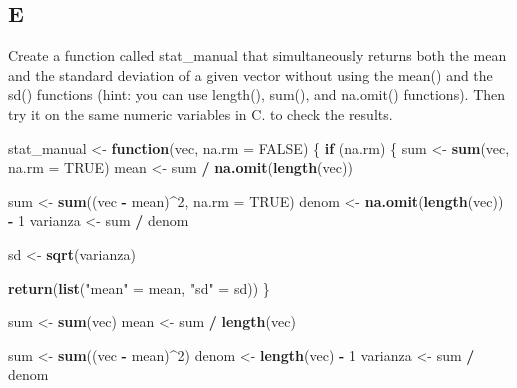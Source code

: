 \documentclass[
]{article}
\newenvironment{Shaded}{\begin{snugshade}}{\end{snugshade}}
\newcommand{\AttributeTok}[1]{\textcolor[rgb]{0.13,0.29,0.53}{#1}}
\newcommand{\ConstantTok}[1]{\textcolor[rgb]{0.56,0.35,0.01}{#1}}
\newcommand{\ControlFlowTok}[1]{\textcolor[rgb]{0.13,0.29,0.53}{\textbf{#1}}}
\newcommand{\DecValTok}[1]{\textcolor[rgb]{0.00,0.00,0.81}{#1}}
\newcommand{\FunctionTok}[1]{\textcolor[rgb]{0.13,0.29,0.53}{\textbf{#1}}}
\newcommand{\NormalTok}[1]{#1}
\newcommand{\OtherTok}[1]{\textcolor[rgb]{0.56,0.35,0.01}{#1}}
\newcommand{\SpecialCharTok}[1]{\textcolor[rgb]{0.81,0.36,0.00}{\textbf{#1}}}
\newcommand{\StringTok}[1]{\textcolor[rgb]{0.31,0.60,0.02}{#1}}
\begin{document}
\hypertarget{e}{%
\subsection{E}\label{e}}

Create a function called stat\_manual that simultaneously returns both
the mean and the standard deviation of a given vector without using the
mean() and the sd() functions (hint: you can use length(), sum(), and
na.omit() functions). Then try it on the same numeric variables in C. to
check the results.

\begin{Shaded}
\begin{Highlighting}[]
\NormalTok{stat\_manual }\OtherTok{\textless{}{-}} \ControlFlowTok{function}\NormalTok{(vec, }\AttributeTok{na.rm =} \ConstantTok{FALSE}\NormalTok{) \{}
  \ControlFlowTok{if}\NormalTok{ (na.rm) \{}
\NormalTok{    sum }\OtherTok{\textless{}{-}} \FunctionTok{sum}\NormalTok{(vec, }\AttributeTok{na.rm =} \ConstantTok{TRUE}\NormalTok{)}
\NormalTok{    mean }\OtherTok{\textless{}{-}}\NormalTok{ sum }\SpecialCharTok{/} \FunctionTok{na.omit}\NormalTok{(}\FunctionTok{length}\NormalTok{(vec))}

\NormalTok{    sum }\OtherTok{\textless{}{-}} \FunctionTok{sum}\NormalTok{((vec }\SpecialCharTok{{-}}\NormalTok{ mean)}\SpecialCharTok{\^{}}\DecValTok{2}\NormalTok{, }\AttributeTok{na.rm =} \ConstantTok{TRUE}\NormalTok{)}
\NormalTok{    denom }\OtherTok{\textless{}{-}} \FunctionTok{na.omit}\NormalTok{(}\FunctionTok{length}\NormalTok{(vec)) }\SpecialCharTok{{-}} \DecValTok{1}
\NormalTok{    varianza }\OtherTok{\textless{}{-}}\NormalTok{ sum }\SpecialCharTok{/}\NormalTok{ denom}

\NormalTok{    sd }\OtherTok{\textless{}{-}} \FunctionTok{sqrt}\NormalTok{(varianza)}

    \FunctionTok{return}\NormalTok{(}\FunctionTok{list}\NormalTok{(}\StringTok{"mean"} \OtherTok{=}\NormalTok{ mean, }\StringTok{"sd"} \OtherTok{=}\NormalTok{ sd))}
\NormalTok{  \}}

\NormalTok{  sum }\OtherTok{\textless{}{-}} \FunctionTok{sum}\NormalTok{(vec)}
\NormalTok{  mean }\OtherTok{\textless{}{-}}\NormalTok{ sum }\SpecialCharTok{/} \FunctionTok{length}\NormalTok{(vec)}

\NormalTok{  sum }\OtherTok{\textless{}{-}} \FunctionTok{sum}\NormalTok{((vec }\SpecialCharTok{{-}}\NormalTok{ mean)}\SpecialCharTok{\^{}}\DecValTok{2}\NormalTok{)}
\NormalTok{  denom }\OtherTok{\textless{}{-}} \FunctionTok{length}\NormalTok{(vec) }\SpecialCharTok{{-}} \DecValTok{1}
\NormalTok{  varianza }\OtherTok{\textless{}{-}}\NormalTok{ sum }\SpecialCharTok{/}\NormalTok{ denom}


\end{Highlighting}
\end{Shaded}
\end{document}
